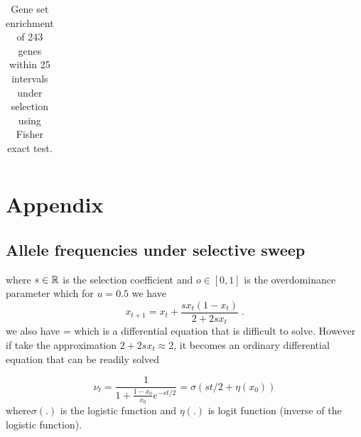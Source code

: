 \documentclass[11pt]{article}
\begin{document}
\begin{table}[h]
	\begin{tabular}{c}
		
	\end{tabular}
	\caption{Gene set enrichment of 243 genes within 25 intervals under 
	selection using Fisher exact test.}\label{tab:Fisher}
\end{table}

\newpage


%
%
%
%
%
%

\clearpage
\setcounter{figure}{0}
\setcounter{table}{0}
\setcounter{equation}{0}
\renewcommand{\thefigure}{S\arabic{figure}}
\renewcommand{\thetable}{S\arabic{table}}
\renewcommand{\theequation}{S\arabic{equation}}



\section{Appendix}
\subsection{Allele frequencies under selective sweep} \label{app:af}

\beq
\eeq
where $s\in {\mathbb R}$ is the selection coefficient and $o\in[0,1]$ is the 
overdominance parameter which for $u=0.5$ we have
\begin{equation}
x_{t+1}=x_t+\frac{sx_t(1-x_t)}{2+2sx_t}\;.
\label{eq:transition}
\end{equation}
we also have
\beq
{} = 
\eeq
which is a differential equation that is difficult to solve. However if take 
the approximation $2+2sx_t \approx 2$, it becomes an ordinary differential 
equation that can be readily solved

\begin{equation}
\nu_t =\frac{1}{1+\frac{1-x_0}{x_0}e^{-st/2}} = \sigma(st/2+\eta(x_0)) 
\label{eq:inf-pop}
\end{equation}
where$\sigma(.)$ is the logistic
function and $\eta(.)$ is logit function (inverse of the logistic function). 
\end{document}
